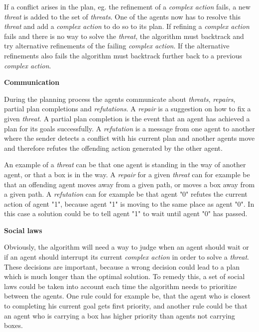 \documentclass[Main]{subfiles}
\begin{document}
If a conflict arises in the plan, eg. the refinement of a \textit{complex action} fails, a new \textit{threat} is added to the set of \textit{threats}.
One of the agents now has to resolve this \textit{threat} and add a \textit{complex action} to do so to its plan.
If refining a \textit{complex action} fails and there is no way to solve the \textit{threat}, the algorithm must backtrack and try alternative refinements of the failing \textit{complex action}. If the alternative refinements also fails the algorithm must backtrack further back to a previous \textit{complex action}.


\textbf{Communication}

During the planning process the agents communicate about \textit{threats}, \textit{repairs}, partial plan completions and \textit{refutations}.
A \textit{repair} is a suggestion on how to fix a given \textit{threat}.
A partial plan completion is the event that an agent has achieved a plan for its goals successfully.
A \textit{refutation} is a message from one agent to another where the sender detects a conflict with his current plan and another agents move and therefore refutes the offending action generated by the other agent.

An example of a \textit{threat} can be that one agent is standing in the way of another agent, or that a box is in the way.
A \textit{repair} for a given \textit{threat} can for example be that an offending agent moves away from a given path, or moves a box away from a given path.
A \textit{refutation} can for example be that agent "0" refutes the current action of agent "1", because agent "1" is moving to the same place as agent "0". In this case a solution could be to tell agent "1" to wait until agent "0" has passed.


\textbf{Social laws}

Obviously, the algorithm will need a way to judge when an agent should wait or if an agent should interrupt its current \textit{complex action} in order to solve a \textit{threat}. These decisions are important, because a wrong decision could lead to a plan which is much longer than the optimal solution.
To remedy this, a set of social laws could be taken into account each time the algorithm needs to prioritize between the agents.
One rule could for example be, that the agent who is closest to completing his current goal gets first priority, and another rule could be that an agent who is carrying a box has higher priority than agents not carrying boxes.
\end{document}
